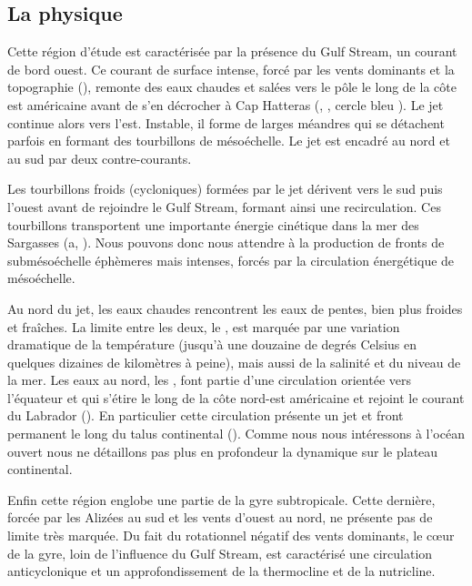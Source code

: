 \subsection{La physique}
\label{sec:gs-physique}

Cette région d'étude est caractérisée par la présence du Gulf Stream, un courant de bord ouest.
Ce courant de surface intense, forcé par les vents dominants et la topographie (\cite{fieux_2010}), remonte des eaux chaudes et salées vers le pôle le long de la côte est américaine avant de s'en décrocher à Cap Hatteras (, , cercle bleu ).
Le jet continue alors vers l'est. Instable, il forme de larges méandres qui se détachent parfois en formant des tourbillons de mésoéchelle.
Le jet est encadré au nord et au sud par deux contre-courants.

Les tourbillons froids (cycloniques) formées par le jet dérivent vers le sud puis l'ouest avant de rejoindre le Gulf Stream, formant ainsi une recirculation.
Ces tourbillons transportent une importante énergie cinétique dans la mer des Sargasses (a, \cite{wunsch_1998,zhai_2008}).
Nous pouvons donc nous attendre à la production de fronts de submésoéchelle éphèmeres mais intenses, forcés par la circulation énergétique de mésoéchelle.

Au nord du jet, les eaux chaudes rencontrent les eaux de pentes, bien plus froides et fraîches.
La limite entre les deux, le , est marquée par une variation dramatique de la température (jusqu'à une douzaine de degrés Celsius en quelques dizaines de kilomètres à peine), mais aussi de la salinité et du niveau de la mer.
Les eaux au nord, les , font partie d'une circulation orientée vers l'équateur et qui s'étire le long de la côte nord-est américaine et rejoint le courant du Labrador (\cite{fieux_2010,townsend_2004}).
En particulier cette circulation présente un jet et front permanent le long du talus continental (\cite{linder_1998,flagg_2006}).
Comme nous nous intéressons à l'océan ouvert nous ne détaillons pas plus en profondeur la dynamique sur le plateau continental.

Enfin cette région englobe une partie de la gyre subtropicale.
Cette dernière, forcée par les Alizées au sud et les vents d'ouest au nord, ne présente pas de limite très marquée.
Du fait du rotationnel négatif des vents dominants, le cœur de la gyre, loin de l'influence du Gulf Stream, est caractérisé une circulation anticyclonique et un approfondissement de la thermocline et de la nutricline.

